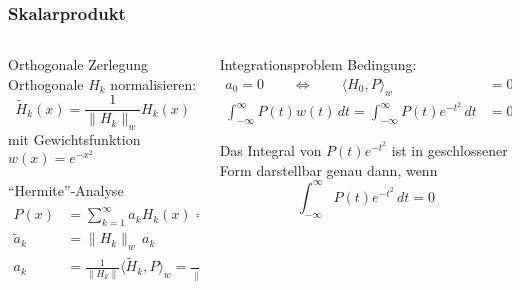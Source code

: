 %
%
%
\bgroup
\begin{frame}[t]
\setlength{\abovedisplayskip}{5pt}
\setlength{\belowdisplayskip}{5pt}
\frametitle{Skalarprodukt}
\vspace{-20pt}
\begin{columns}[t,onlytextwidth]
\begin{column}{0.48\textwidth}
\begin{block}{Orthogonale Zerlegung}
Orthogonale $H_k$ normalisieren:
\[
\tilde{H}_k(x) = \frac{1}{\|H_k\|_w} H_k(x)
\]
mit Gewichtsfunktion $w(x)=e^{-x^2}$
\end{block}
\begin{block}{``Hermite''-Analyse}
\begin{align*}
P(x)
&=
\sum_{k=1}^\infty a_k H_k(x)
=
\sum_{k=1}^\infty \tilde{a}_k \tilde{H}_k(x)
\\
\tilde{a}_k
&=
\| H_k\|_w\, a_k
\\
a_k
&=
\frac{1}{\|H_k\|}
\langle \tilde{H}_k, P\rangle_w
=
\frac{1}{\|H_k\|^2}
\langle H_k, P\rangle_w
\end{align*}
\end{block}
\end{column}
\begin{column}{0.48\textwidth}
\begin{block}{Integrationsproblem}
Bedingung:
\begin{align*}
a_0=0
\qquad\Leftrightarrow\qquad
\langle H_0,P\rangle_w
&=
0
\\
\int_{-\infty}^\infty
P(t) w(t)  \,dt
=
\int_{-\infty}^\infty
P(t) e^{-t^2}  \,dt
&=
0
\end{align*}
\end{block}
\begin{theorem}
Das Integral von $P(t)e^{-t^2}$ ist in geschlossener Form darstellbar
genau dann, wenn
\[
\int_{-\infty}^\infty P(t)e^{-t^2}\,dt = 0
\]
\end{theorem}
\end{column}
\end{columns}
\end{frame}
\egroup
